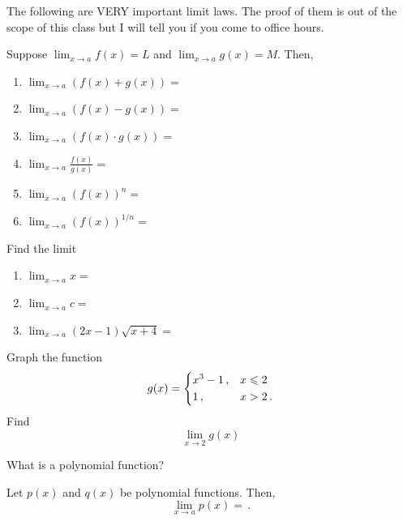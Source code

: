 \documentclass[12pt]{amsart}
\begin{document}
\begin{theorem}
	The following are VERY important limit laws.
	The proof of them is out of the scope of this class but I will
	tell you if you come to office hours.

	Suppose $\lim_{x\to a} f(x) = L$ and $\lim_{x\to a} g(x) = M$.
	Then,
	\begin{enumerate}
		\item $\displaystyle \lim_{x\to a} (f(x) + g(x)) =$
		\item $\displaystyle \lim_{x\to a} (f(x) - g(x)) =$
		\item $\displaystyle \lim_{x\to a} (f(x) \cdot g(x)) =$
		\item $\displaystyle \lim_{x\to a} \frac{f(x)}{g(x)} =$
		\item $\displaystyle \lim_{x\to a} (f(x))^n =$
		\item $\displaystyle \lim_{x\to a} (f(x))^{1/n} =$
	\end{enumerate}

\end{theorem}


\begin{question}
	Find the limit
	\begin{enumerate}
		\item $\displaystyle \lim_{x\to a} x = $
		\item $\displaystyle \lim_{x\to a} c = $
		\item $\displaystyle \lim_{x\to a} (2x -1)\sqrt{x + 4} = $
	\end{enumerate}
\end{question}

\begin{question}
	Graph the function
	\begin{equation*}
		g(x) = \begin{dcases}
			x^3 - 1 \,, & x \leq 2  \\
			1 \,,       & x > 2 \,.
		\end{dcases}
	\end{equation*}
	Find
	\begin{equation*}
		\lim_{x\to 2} g(x)
	\end{equation*}

\end{question}

\begin{question}
	What is a polynomial function?
\end{question}
\begin{theorem}
	Let $p(x)$ and $q(x)$ be polynomial functions. Then,
	\begin{equation*}
		\lim_{x \to a} p(x) = \,.
	\end{equation*}
\end{theorem}
\end{document}
